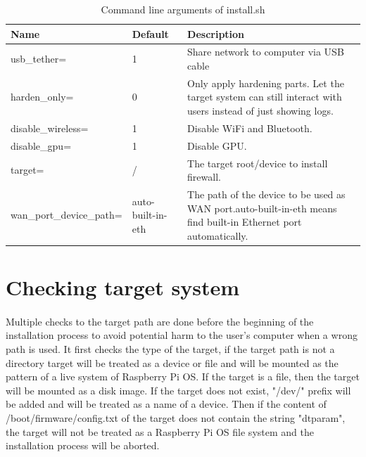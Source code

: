 \documentclass[mscthesis]{usiinfthesis}
\begin{document}
\begin{table}[H]
  \centering
  \begin{tabular}{|m{27mm}|m{30mm}|m{68mm}|}
    \hline
    Name                              & Default           & Description                                                                                                               \\
    \hline
    usb\_tether=                      & 1                 & Share network to computer via USB cable                                                                                   \\
    harden\_only=                     & 0                 & Only apply hardening parts. Let the target system can still interact with users instead of just showing logs.             \\
    disable\_wireless=                & 1                 & Disable WiFi and Bluetooth.                                                                                               \\
    disable\_gpu=                     & 1                 & Disable GPU.                                                                                                              \\
    target=                           & /                 & The target root/device to install firewall.                                                                               \\
    wan\_port\_\newline device\_path= & auto-built-in-eth & The path of the device to be used as WAN port.\newline auto-built-in-eth means find built-in Ethernet port automatically. \\
    \hline
  \end{tabular}
  \caption{Command line arguments of install.sh}
  \label{tab:install_arg}
\end{table}

\section{Checking target system}
\paragraph{}
Multiple checks to the target path are done before the beginning of the installation process to avoid potential harm to the user's computer when a wrong path is used. It first checks the type of the target, if the target path is not a directory target will be treated as a device or file and will be mounted as the pattern of a live system of Raspberry Pi OS. If the target is a file, then the target will be mounted as a disk image. If the target does not exist, "/dev/" prefix will be added and will be treated as a name of a device. Then if the content of /boot/firmware/config.txt of the target does not contain the string "dtparam", the target will not be treated as a Raspberry Pi OS file system and the installation process will be aborted.
\end{document}
